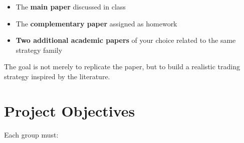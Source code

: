 \documentclass[12pt]{article}
\begin{document}
\begin{itemize}
\item The \textbf{main paper} discussed in class
\item The \textbf{complementary paper} assigned as homework
\item \textbf{Two additional academic papers} of your choice related to the
same strategy family
\end{itemize}

\noindent The goal is not merely to replicate the paper, but to build a realistic
trading strategy inspired by the literature.

\section*{Project Objectives}

\noindent Each group must:
\end{document}

